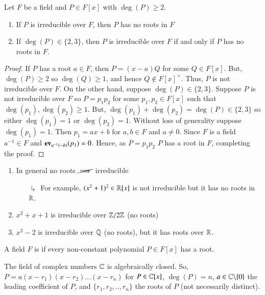 \documentclass[12pt, a4paper, oneside, openright, titlepage]{book}
\begin{document}
\begin{prop}
    Let $F$ be a field and $P \in F[x]$ with $\deg(P) \geq 2$.  
    \begin{enumerate}
        \item If $P$ is irreducible over $F$, then $P$ has no roots in $F$
        \item If $\deg(P) \in \{2,3\}$, then $P$ is irreducible over $F$ if and only if $P$ has no roots in $F$.
    \end{enumerate}
\end{prop}
\begin{proof}
    If $P$ has a root $a \in F$, then $P = (x-a)Q$ for some $Q \in F[x]$. But, $\deg(P) \geq 2$ so $\deg(Q) \geq 1$, and hence $Q \notin F[x]^{\times}$. Thus, $P$ is not irreducible over $F$. On the other hand, suppose $\deg(P) \in \{2,3\}$. Suppose $P$ is not irreducible over $F$ so $P = p_1p_2$ for some $p_1, p_2 \in F[x]$ such that $\deg(p_1),\deg(p_2) \geq 1$. But, $\deg(p_1)+\deg(p_2) = \deg(P) \in \{2,3\}$ so either $\deg(p_1) = 1$ or $\deg(p_2) = 1$. Without loss of generality suppose $\deg(p_1) = 1$. Then $p_1 = ax+b$ for $a,b \in F$ and $a \neq 0$. Since $F$ is a field $a^{-1} \in F$ and $\operatorname{\bf{ev}}_{a^{-1}(-b)}(p_1) = 0$. Hence, as $P = p_1p_2$ $P$ has a root in $F$, completing the proof.
\end{proof}

\begin{rmk}
    \leavevmode
    \begin{enumerate}
        \item In general no roots $\cancel{\implies}$ irreducible
        \begin{enumerate}
            \item[$\drsh$] For example, $(x^2+1)^2 \in \mathbb R[x]$ is not irreducible but it has no roots in $\mathbb R$. 
        \end{enumerate}
        \item $x^2+x+1$ is irreducible over $\mathbb Z/2\mathbb Z$ (no roots)
        \item $x^2-2$ is irreducible over $\mathbb Q$ (no roots), but it has roots over $\mathbb R$.
    \end{enumerate}
\end{rmk}

\begin{defn}
    A field $F$ is  if every non-constant polynomial $P \in F[x]$ has a root.
\end{defn}

\begin{namthm}
    The field of complex numbers $\mathbb C$ is algebraically closed. So, $P = a(x-r_1)(x-r_2)...(x-r_n)$ for $P \in \mathbb C[x]$, $\deg(P) = n$, $a \in \mathbb C\backslash\{0\}$ the leading coefficient of $P$, and $\{r_1,r_2,..,r_n\}$ the roots of $P$ (not necessarily distinct).
\end{namthm}
\end{document}
